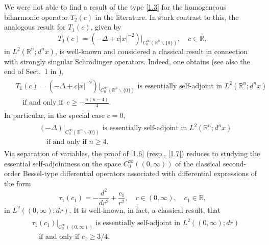 \documentclass[reqno,11pt,centertags]{amsart}
\newcommand{\bbR}{{\mathbb{R}}}
\newcommand{\<}{\langle}
\renewcommand{\>}{\rangle}
\newcommand{\lb}{\label}
\newcommand{\f}{\frac}
\numberwithin{equation}{section}
\theoremstyle{definition}
\begin{document}
We were not able to find a result of the type \eqref{1.3} for the homogeneous biharmonic operator $T_2(c)$ in the literature. In stark contrast to this, the analogous result for $T_1(c)$, given by 
\begin{equation}
T_1(c) = \left(-\Delta +c|x|^{-2}\right)\big|_{C_0^{\infty}(\bbR^n \backslash \{0\})}, \quad c \in \bbR,  
\end{equation}
in $L^2(\bbR^n;d^nx)$, is well-known and considered a classical result in connection with strongly singular Schr\"odinger operators. Indeed, one obtains (see also the end of Sect.~1 in \cite{KW72}), 
\begin{align} 
\begin{split} 
& \text{$T_1(c) = \left(-\Delta +c|x|^{-2}\right)\big|_{C_0^{\infty}(\bbR^n \backslash \{0\})}$ is essentially self-adjoint in $L^2(\bbR^n;d^nx)$}     \lb{1.6} \\
& \quad \text{if and only if } \,  
c \geq - \f{n(n-4)}{4}. 
\end{split} 
\end{align} 
In particular, in the special case $c=0$, 
\begin{align}
\begin{split} 
& \text{$(-\Delta)\big|_{C_0^{\infty}(\bbR^n \backslash \{0\})}$ is essentially self-adjoint in 
$L^2(\bbR^n; d^n x)$}     \lb{1.7} \\
& \quad \text{if and only if $n \geq 4$.} 
\end{split} 
\end{align} 
Via separation of variables, the proof of \eqref{1.6} (resp., \eqref{1.7}) reduces to studying the  
essential self-adjointness on the space $C_0^{\infty}((0,\infty))$ of the classical second-order Bessel-type differential operators associated with differential expressions  of the form 
\begin{equation}
\tau_1(c_1) = - \frac{d^2}{dr^2} + \frac{c_1}{r^2} , \quad r \in (0,\infty), \quad c_1 \in \bbR,     \lb{1.9} 
\end{equation} 
in $L^2((0,\infty);dr)$. It is well-known, in fact, a classical result, that 
\begin{align}
\begin{split}
& \text{$\tau_1(c_1)|_{C_0^{\infty}((0,\infty))}$ is essentially self-adjoint in $L^2((0,\infty);dr)$} \\
& \quad \text{if and only if $c_1 \geq 3/4$}.
\end{split}
\end{align}  
\end{document}
